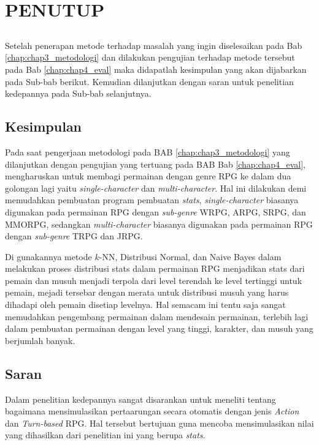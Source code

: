 \chapter{PENUTUP}
\label{sec:chap5_tutup}
\vspace{1ex}

\section*{}
Setelah penerapan metode terhadap masalah yang ingin diselesaikan pada Bab \ref{chap:chap3_metodologi} dan dilakukan pengujian terhadap metode tersebut pada Bab \ref*{chap:chap4_eval} maka didapatlah kesimpulan yang akan dijabarkan pada Sub-bab berikut. Kemudian dilanjutkan dengan saran untuk penelitian kedepannya pada Sub-bab selanjutnya.
\vspace{1ex}

\section{Kesimpulan}
\label{sec:sec4_kesimpulan}
\vspace{1ex}

Pada saat pengerjaan metodologi pada BAB \ref{chap:chap3_metodologi} yang dilanjutkan dengan pengujian yang tertuang pada BAB Bab \ref*{chap:chap4_eval}, mengharuskan untuk membagi permainan dengan genre RPG ke dalam dua golongan lagi yaitu \textit{single-character} dan \textit{multi-character}. Hal ini dilakukan demi memudahkan pembuatan program pembuatan \textit{stats}, \textit{single-character} biasanya digunakan pada permainan RPG dengan \textit{sub-genre} WRPG, ARPG, SRPG, dan MMORPG, sedangkan \textit{multi-character} biasanya digunakan pada permainan RPG dengan \textit{sub-genre} TRPG dan JRPG.
\vspace{1ex}

Di gunakannya metode $k$-NN, Distribusi Normal, dan Naive Bayes dalam melakukan proses distribusi stats dalam permainan RPG menjadikan stats dari pemain dan musuh menjadi terpola dari level terendah ke level tertinggi untuk pemain, mejadi tersebar dengan merata untuk distribusi musuh yang harus dihadapi oleh pemain disetiap levelnya. Hal semacam ini tentu saja sangat memudahkan pengembang permainan dalam mendesain permainan, terlebih lagi dalam pembuatan permainan dengan level yang tinggi, karakter, dan musuh yang berjumlah banyak.
\vspace{1ex}

\section{Saran}
\label{sec:sec4_saran}
\vspace{1ex}

Dalam penelitian kedepannya sangat disarankan untuk meneliti tentang bagaimana mensimulasikan pertaarungan secara otomatis dengan jenis \textit{Action} dan \textit{Turn-based} RPG. Hal tersebut bertujuan guna mencoba mensimulasikan nilai yang dihasilkan dari penelitian ini yang berupa \textit{stats}.